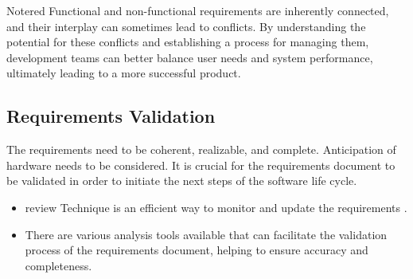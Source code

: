 \begin{prettyBox}{Note}{red}
 Functional and non-functional requirements are inherently connected, and their interplay can sometimes lead to conflicts. 
 By understanding the potential for these conflicts and establishing a process for managing them, development teams can better
 balance user needs and system performance, ultimately leading to a more successful product.
\end{prettyBox}

\subsection{Requirements Validation}
The requirements need to be coherent, realizable, and complete. Anticipation of hardware needs to be considered. 
It is crucial for the requirements document to be validated in order to initiate the next steps of the software life cycle.

\begin{itemize}
    \item review Technique is an efficient way to monitor and update the requirements .
    \item There are various analysis tools available that can facilitate the validation process of the requirements document,
helping to ensure accuracy and completeness.
\end{itemize}

